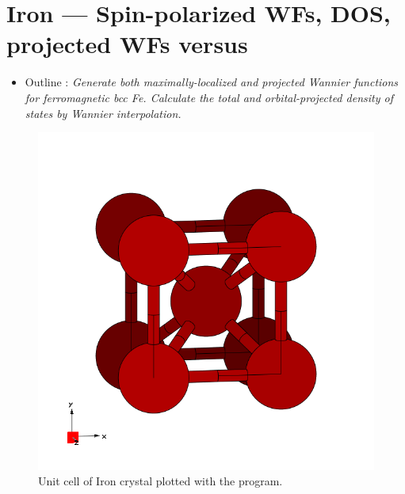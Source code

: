 \section{Iron --- Spin-polarized WFs, DOS, projected WFs versus \MLWFs}
\label{sec8:Iron}

\begin{itemize}
	\item Outline : {\it Generate both maximally-localized and projected Wannier functions for ferromagnetic bcc Fe. Calculate the total and orbital-projected density of states by Wannier interpolation.}
\end{itemize}

\begin{figure}[h!]
\centering
\includegraphics[width=0.25\columnwidth,trim={45pt 45pt 55pt 55pt},clip]{figure/example08/iron.png}
\caption{Unit cell of Iron crystal plotted with the \xcrysden{} program.}
\label{fig8.0}
\end{figure}

